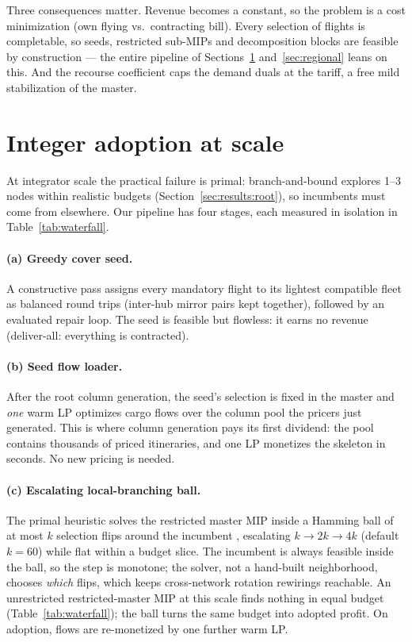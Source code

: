 \documentclass[11pt]{article}
\begin{document}
Three consequences matter. Revenue becomes a constant, so the problem is a
cost minimization (own flying vs.\ contracting bill). Every selection of
flights is completable, so seeds, restricted sub-MIPs and decomposition
blocks are feasible by construction --- the entire pipeline of
Sections~\ref{sec:adoption} and~\ref{sec:regional} leans on this. And the
recourse coefficient caps the demand duals at the tariff, a free mild
stabilization of the master.

\section{Integer adoption at scale}\label{sec:adoption}

At integrator scale the practical failure is primal: branch-and-bound
explores 1--3 nodes within realistic budgets
(Section~\ref{sec:results:root}), so incumbents must come from elsewhere.
Our pipeline has four stages, each measured in isolation in
Table~\ref{tab:waterfall}.

\paragraph{(a) Greedy cover seed.} A constructive pass assigns every
mandatory flight to its lightest compatible fleet as balanced round trips
(inter-hub mirror pairs kept together), followed by an evaluated repair loop.
The seed is feasible but flowless: it earns no revenue (deliver-all:
everything is contracted).

\paragraph{(b) Seed flow loader.} After the root column generation, the
seed's selection is fixed in the master and \emph{one} warm LP optimizes
cargo flows over the column pool the pricers just generated. This is where
column generation pays its first dividend: the pool contains thousands of
priced itineraries, and one LP monetizes the skeleton in seconds. No new
pricing is needed.

\paragraph{(c) Escalating local-branching ball.} The primal heuristic solves
the restricted master MIP inside a Hamming ball of at most $k$ selection
flips around the incumbent \cite{fischetti2003}, escalating
$k \to 2k \to 4k$ (default $k=60$) while flat within a budget slice. The
incumbent is always feasible inside the ball, so the step is monotone; the
solver, not a hand-built neighborhood, chooses \emph{which} flips, which
keeps cross-network rotation rewirings reachable. An unrestricted
restricted-master MIP at this scale finds nothing in equal budget
(Table~\ref{tab:waterfall}); the ball turns the same budget into adopted
profit. On adoption, flows are re-monetized by one further warm LP.
\end{document}
